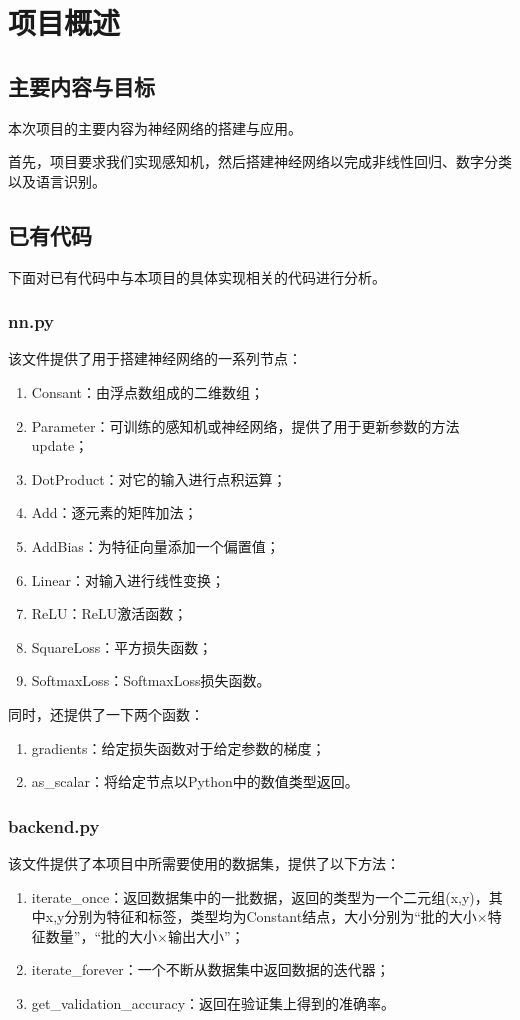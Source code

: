 \chapter{项目概述}
\section{主要内容与目标}
本次项目的主要内容为神经网络的搭建与应用。

首先，项目要求我们实现感知机，然后搭建神经网络以完成非线性回归、数字分类以及语言识别。
\section{已有代码}
下面对已有代码中与本项目的具体实现相关的代码进行分析。
\subsection{nn.py}
该文件提供了用于搭建神经网络的一系列节点：
\begin{enumerate}
    \item Consant：由浮点数组成的二维数组；
    \item Parameter：可训练的感知机或神经网络，提供了用于更新参数的方法update；
    \item DotProduct：对它的输入进行点积运算；
    \item Add：逐元素的矩阵加法；
    \item AddBias：为特征向量添加一个偏置值；
    \item Linear：对输入进行线性变换；
    \item ReLU：ReLU激活函数；
    \item SquareLoss：平方损失函数；
    \item SoftmaxLoss：SoftmaxLoss损失函数。
\end{enumerate}

同时，还提供了一下两个函数：
\begin{enumerate}
    \item gradients：给定损失函数对于给定参数的梯度；
    \item as\_scalar：将给定节点以Python中的数值类型返回。
\end{enumerate}
\subsection{backend.py}
该文件提供了本项目中所需要使用的数据集，提供了以下方法：
\begin{enumerate}
    \item iterate\_once：返回数据集中的一批数据，返回的类型为一个二元组(x,y)，其中x,y分别为特征和标签，类型均为Constant结点，大小分别为“批的大小$\times$特征数量”，“批的大小$\times$输出大小”；
    \item iterate\_forever：一个不断从数据集中返回数据的迭代器；
    \item get\_validation\_accuracy：返回在验证集上得到的准确率。
\end{enumerate}